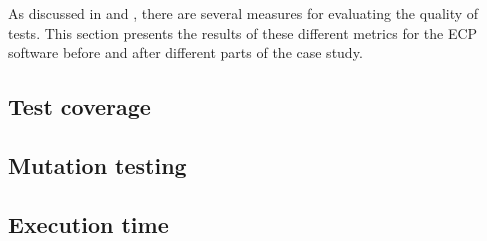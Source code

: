 
As discussed in  and , there are
several measures for evaluating the quality of tests. This section
presents the results of these different metrics for the ECP software
before and after different parts of the case study.\\


\subsection{Test coverage}
    

\subsection{Mutation testing}
    

\subsection{Execution time}
    
